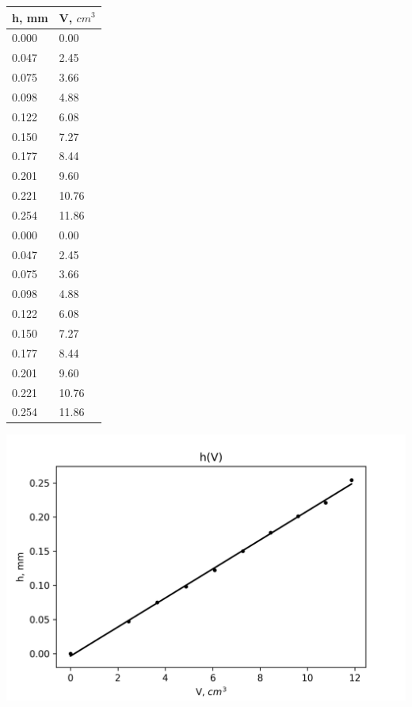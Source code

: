 \documentclass[a4paper,12pt]{article}
\begin{document}

\begin{center}
\begin{table}[]
\centering
\begin{tabular}{|l|l|}
\hline
h, mm & V, $cm^3$ \\ \hline
0.000 & 0.00 \\ \hline
0.047 & 2.45 \\ \hline
0.075 & 3.66 \\ \hline
0.098 & 4.88 \\ \hline
0.122 & 6.08 \\ \hline
0.150 & 7.27 \\ \hline
0.177 & 8.44 \\ \hline
0.201 & 9.60 \\ \hline
0.221 & 10.76 \\ \hline
0.254 & 11.86 \\ \hline
0.000 & 0.00 \\ \hline
0.047 & 2.45 \\ \hline
0.075 & 3.66 \\ \hline
0.098 & 4.88 \\ \hline
0.122 & 6.08 \\ \hline
0.150 & 7.27 \\ \hline
0.177 & 8.44 \\ \hline
0.201 & 9.60 \\ \hline
0.221 & 10.76 \\ \hline
0.254 & 11.86 \\ \hline
\end{tabular}
\end{table}

\includegraphics[width = 1  \textwidth]{plot}
\end{center}
\end{document}
